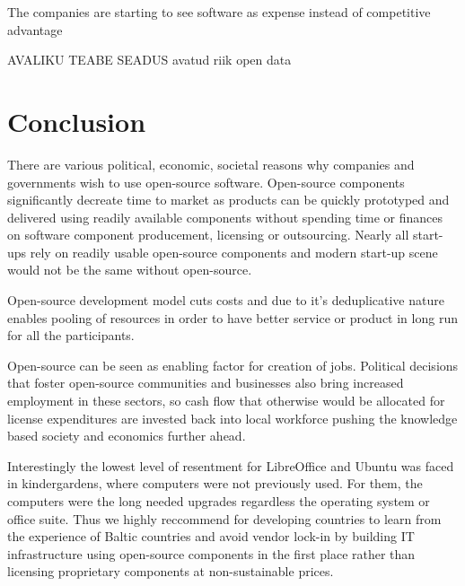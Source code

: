 \documentclass{article}
\begin{document}
The companies are starting to see 
software as expense instead of competitive advantage
\cite{eesti-telekom-annab-arisektorile-suunatud-tarkvara-vabakasutusse}


AVALIKU TEABE SEADUS
avatud riik
open data


\section{Conclusion}

There are various political, economic, societal reasons why
companies and governments wish to use open-source software.
Open-source components significantly decreate time to market
as products can be quickly prototyped and delivered using
readily available components without spending time or finances on
software component producement, licensing or outsourcing.
Nearly all start-ups rely on readily usable open-source
components and modern start-up scene would not be the same
without open-source.

Open-source development model cuts costs and due to
it's deduplicative nature enables pooling of resources 
in order to have better service or product in long run
for all the participants.


Open-source can be seen as enabling factor for creation of jobs.
Political decisions that foster open-source communities and businesses
also bring increased employment in these sectors,
so cash flow that otherwise would be allocated for
license expenditures
are invested back into local workforce 
pushing the knowledge based society and economics further ahead.

Interestingly the lowest level of resentment for LibreOffice and
Ubuntu was faced in kindergardens,
where computers were not previously used.
For them, the computers were the long needed upgrades
regardless the operating system or office suite.
Thus we highly reccommend for
developing countries to learn from the experience of Baltic countries
and avoid vendor lock-in by building IT infrastructure using
open-source components in the first place
rather than licensing proprietary components
at non-sustainable prices.
\end{document}
